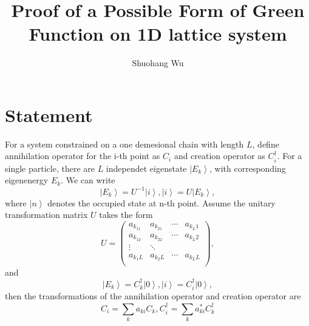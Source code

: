 \documentclass[prb,superscriptaddress,letter,10pt,onecolumn]{revtex4}
\begin{document}
\title{Proof of a Possible Form of Green Function on 1D lattice system}
\author{Shuohang Wu}

\maketitle

\section{Statement}

For a system constrained on a one demesional chain with length $L$, define annihilation operator for the i-th point as $C_i$ and creation operator as $C_i^\dagger$.
For a single particle, there are $L$ independet eigenstate $\left|E_k\right>$, with corresponding eigenenergy $E_k$.
We can write
\begin{equation}
	\left|E_k\right> = U^{-1}\left|i\right>,
	\left|i\right> = U\left|E_k\right>,
\end{equation}
where $\left|n\right>$ denotes the occupied state at n-th point.
Assume the unitary transformation matrix $U$ takes the form
\begin{equation}
	U =       	
	\left(                 	
	\begin{array}{cccc}   		
		a_{k_11} & a_{k_21} & \cdots & a_{k_L1}\\  		
		a_{k_12} & a_{k_22} & \cdots & a_{k_L2}\\
		\vdots & \ddots &  & \\
		a_{k_1L} & a_{k_2L} & \cdots & a_{k_LL}\\  		
	\end{array}	
	\right),         	
\end{equation}
and
\begin{equation}
	\left|E_k\right> = C_k^\dagger\left|0\right>,
	\left|i\right> = C_i^\dagger\left|0\right>,
\end{equation}
then the transformations of the annihilation operator and creation operator are
\begin{equation}
	C_i = \sum_{k}a_{ki} C_k,
	C_i^\dagger = \sum_{k}a_{ki}^* C_k^\dagger
\end{equation}
\end{document}
